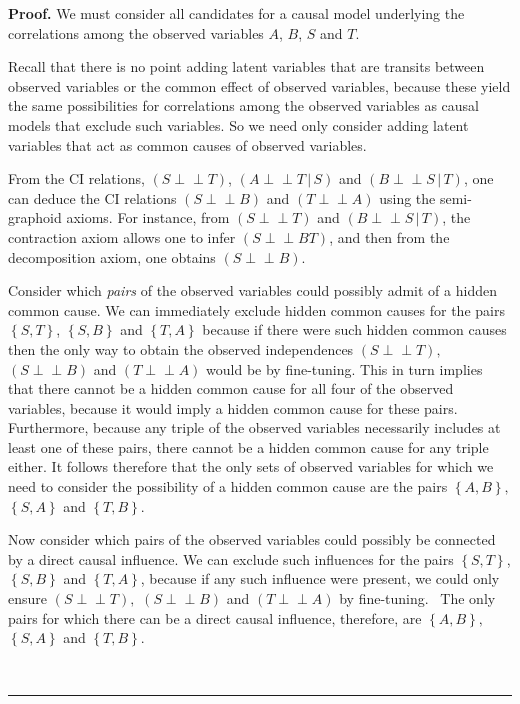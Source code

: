 \documentclass[12pt,onecolumn,nofootinbib]{revtex4-2}
\newenvironment{proof}[1][Proof]{\noindent\textbf{#1.} }{\ \rule{0.5em}{0.5em}}
\def\indep{\perp\!\!\!\!\perp}
\begin{document}
\begin{proof}
We must consider all candidates for a causal
model underlying the correlations among the observed variables $A$, $B$, $S$ and
$T.$

Recall that there is no point adding latent variables that are transits
between observed variables or the common effect of observed variables, because
these yield the same possibilities for correlations among the observed variables as causal models that
exclude such variables. 
So we need only
consider adding latent variables that act as common causes of observed variables.

From the CI relations, $\left( S\indep T\right)$, $\left( A\indep T\,|\,S\right) $ and $\left( B\indep S\,|\,T\right)$, one can deduce the CI relations $\left(S\indep B\right)$ and $\left(T\indep A\right)$ using the semi-graphoid axioms. For instance, from $\left( S\indep T\right)$ and $\left( B\indep S\,|\,T\right)$, the contraction axiom allows one to infer $\left(S \indep BT\right)$, and then from the decomposition axiom, one obtains $\left( S\indep B\right)$.  

Consider which {\em pairs} of the observed variables could possibly
admit of a hidden common cause.  We can immediately exclude hidden common causes for the pairs $\left\{  S,T\right\}  $,
$\left\{  S,B\right\}  $ and $\left\{  T,A\right\}  $ because if there were such hidden common causes then the only way to obtain the observed
independences $\left(S\indep T\right),$ $\left(S\indep B\right)$ and $\left(T\indep A\right)$ would be by fine-tuning.  This in turn implies that there cannot be a hidden common cause for all four of the observed variables, because it would imply a hidden common cause for these pairs.  Furthermore, because any triple of the observed variables necessarily includes at least one of these pairs, there cannot be a hidden common cause for any triple either.
It follows therefore that the only sets of observed variables for which we need to consider the possibility of a hidden common cause are the pairs $\left\{A,B\right\},$ $\left\{  S,A\right\}  $ and $\left\{  T,B\right\}$.

Now consider which pairs of the observed variables could possibly be connected by a direct causal influence.  We can exclude such
influences for the pairs $\left\{S,T\right\}$,
$\left\{S,B\right\}$ and $\left\{T,A\right\}$, because if any such influence were present, we could
only ensure $\left(S\indep T\right),$ $\left(S\indep B\right)$ and $\left(T\indep A\right)$ by fine-tuning. \ The only
pairs for which there can be a direct causal influence, therefore, are $\left\{A,B\right\},$ $\left\{  S,A\right\}  $ and $\left\{  T,B\right\}.$


\end{proof}
\end{document}
